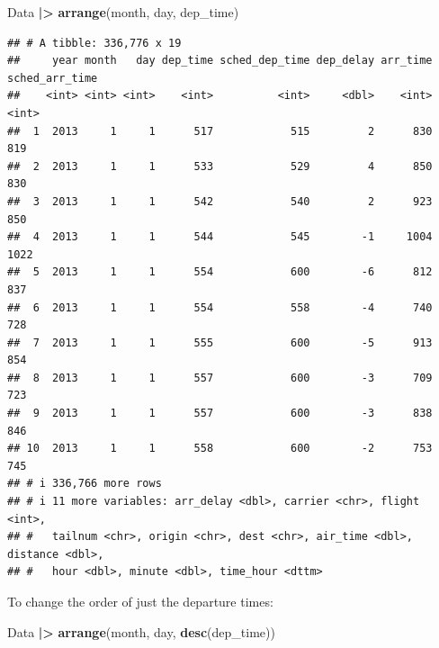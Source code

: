 \documentclass[
]{book}
\newenvironment{Shaded}{\begin{snugshade}}{\end{snugshade}}
\newcommand{\FunctionTok}[1]{\textcolor[rgb]{0.13,0.29,0.53}{\textbf{#1}}}
\newcommand{\NormalTok}[1]{#1}
\newcommand{\SpecialCharTok}[1]{\textcolor[rgb]{0.81,0.36,0.00}{\textbf{#1}}}
\theoremstyle{definition}
\theoremstyle{definition}
\theoremstyle{definition}
\theoremstyle{definition}
\theoremstyle{remark}
\begin{document}
\begin{Shaded}
\begin{Highlighting}[]
\NormalTok{Data }\SpecialCharTok{|\textgreater{}} 
  \FunctionTok{arrange}\NormalTok{(month, day, dep\_time)}
\end{Highlighting}
\end{Shaded}

\begin{verbatim}
## # A tibble: 336,776 x 19
##     year month   day dep_time sched_dep_time dep_delay arr_time sched_arr_time
##    <int> <int> <int>    <int>          <int>     <dbl>    <int>          <int>
##  1  2013     1     1      517            515         2      830            819
##  2  2013     1     1      533            529         4      850            830
##  3  2013     1     1      542            540         2      923            850
##  4  2013     1     1      544            545        -1     1004           1022
##  5  2013     1     1      554            600        -6      812            837
##  6  2013     1     1      554            558        -4      740            728
##  7  2013     1     1      555            600        -5      913            854
##  8  2013     1     1      557            600        -3      709            723
##  9  2013     1     1      557            600        -3      838            846
## 10  2013     1     1      558            600        -2      753            745
## # i 336,766 more rows
## # i 11 more variables: arr_delay <dbl>, carrier <chr>, flight <int>,
## #   tailnum <chr>, origin <chr>, dest <chr>, air_time <dbl>, distance <dbl>,
## #   hour <dbl>, minute <dbl>, time_hour <dttm>
\end{verbatim}

To change the order of just the departure times:

\begin{Shaded}
\begin{Highlighting}[]
\NormalTok{Data }\SpecialCharTok{|\textgreater{}} 
  \FunctionTok{arrange}\NormalTok{(month, day, }\FunctionTok{desc}\NormalTok{(dep\_time))}
\end{Highlighting}
\end{Shaded}
\end{document}
